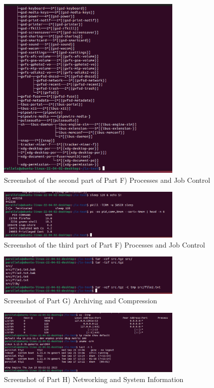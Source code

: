\begin{figure}[h!]
    \centering
    \includegraphics[width=0.8\textwidth]{linuxptF2.png}
    \caption{Screenshot of the second part of Part F) Processes and Job Control}
    \label{fig:problemsetFpt2} %
\end{figure}

\begin{figure}[h!]
    \centering
    \includegraphics[width=0.8\textwidth]{linuxptF3.png}
    \caption{Screenshot of the third part of Part F) Processes and Job Control}
    \label{fig:problemsetFpt3}
\end{figure}

\begin{figure}[h!]
    \centering
    \includegraphics[width=0.8\textwidth]{linuxptG.png}
    \caption{Screenshot of Part G) Archiving and Compression}
    \label{fig:problemsetG}
\end{figure}

\begin{figure}[h!]
    \centering
    \includegraphics[width=0.8\textwidth]{linuxptH.png}
    \caption{Screenshot of Part H) Networking and System Information}
    \label{fig:problemsetH}
\end{figure}

